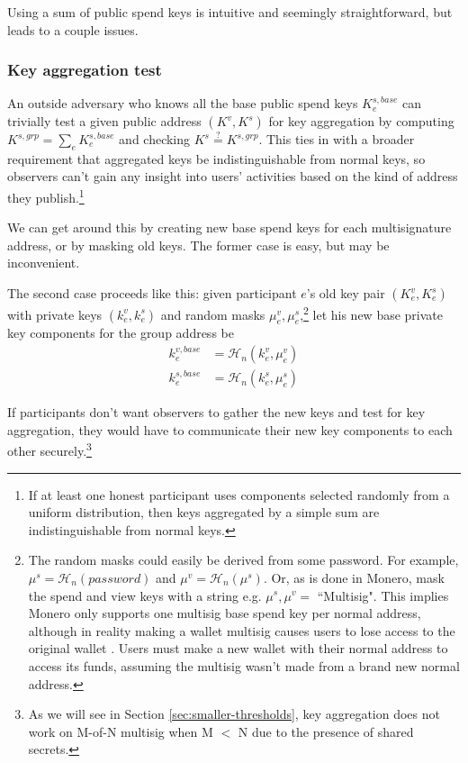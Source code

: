 Using a sum of public spend keys is intuitive and seemingly straightforward, but leads to a couple issues.

\subsubsection*{Key aggregation test}
An outside adversary who knows all the base public spend keys $K^{s,base}_e$ can trivially test a given public address $(K^v,K^s)$ for key aggregation by computing $K^{s,grp} = \sum_e K^{s,base}_e$ and checking $K^s \stackrel{?}{=} K^{s,grp}$. This ties in with a broader requirement that aggregated keys be indistinguishable from normal keys, so observers can't gain any insight into users' activities based on the kind of address they publish.\footnote{If at least one honest participant uses components selected randomly from a uniform distribution, then keys aggregated by a simple sum are indistinguishable \cite{SCOZZAFAVA1993313} from normal keys.}%

We can get around this by creating new base spend keys for each multisignature address, or by masking old keys. The former case is easy, but may be inconvenient.

The second case proceeds like this: given participant $e$'s old key pair $(K^v_e,K^s_e)$ with private keys $(k^v_e,k^s_e)$ and random masks $\mu^v_e,\mu^s_e$,\footnote{The random masks could easily be derived from some password. For example, $\mu^s = \mathcal{H}_n(password)$ and $\mu^v = \mathcal{H}_n(\mu^s)$. Or, as is done in Monero, mask the spend and view keys with a string e.g. $\mu^s,\mu^v =$ ``Multisig". This implies Monero only supports one multisig base spend key per normal address, although in reality making a wallet multisig causes users to lose access to the original wallet \cite{cli-22multisig-instructions}. Users must make a new wallet with their normal address to access its funds, assuming the multisig wasn't made from a brand new normal address.} let his new base private key components for the group address be
\begin{align*}
    k^{v,base}_e &= \mathcal{H}_n(k^v_e,\mu^v_e)\\
    k^{s,base}_e &= \mathcal{H}_n(k^s_e,\mu^s_e)
\end{align*}

If participants don't want observers to gather the new keys and test for key aggregation, they would have to communicate their new key components to each other securely.\footnote{As we will see in Section \ref{sec:smaller-thresholds}, key aggregation does not work on M-of-N multisig when M $<$ N due to the presence of shared secrets.}

